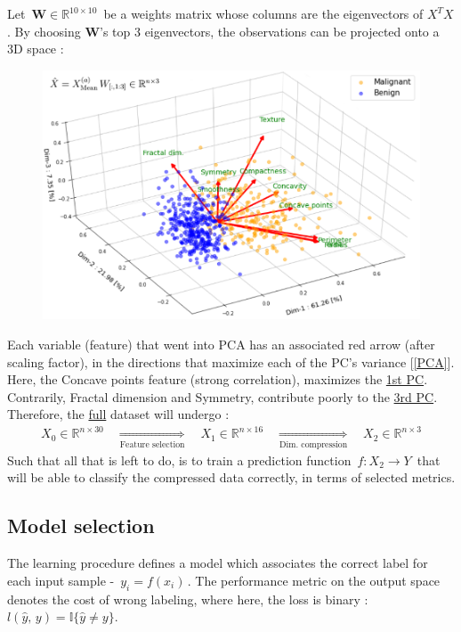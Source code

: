\documentclass[12pt]{article}
\numberwithin{equation}{section}
\begin{document}
\begin{flushleft}
Let $\, \mathbf{W} \in \mathbb{R}^{10\times10} \, $ be a weights matrix whose columns are the eigenvectors of $X^T X$.  By choosing \textbf{W}'s top 3 eigenvectors, the observations can be projected onto a 3D space :
\begin{figure}[H]
\centering
\includegraphics[width=0.935\linewidth, center]{PCA.png}
\end{figure}
Each variable (feature) that went into PCA has an associated red arrow (after scaling factor), in the directions that maximize each of the PC's variance [\ref{PCA}]. Here, the Concave points feature (strong correlation), maximizes the \underline{1st PC}. Contrarily, Fractal dimension and Symmetry, contribute poorly to the \underline{3rd PC}. Therefore, the \underline{full} dataset will undergo :
\begin{align*}
X_0 \in \mathbb{R}^{n \times 30} \quad \underset{\text{Feature selection}}{\Rightarrow} \quad X_1 \in \mathbb{R}^{n \times 16} \quad \underset{\text{Dim. compression}}{\Rightarrow} \quad X_2 \in \mathbb{R}^{n \times 3}
\end{align*}
Such that all that is left to do, is to train a prediction function $\, f : X_2 \rightarrow Y \,$ that will be able to classify the compressed data correctly, in terms of selected metrics.

\subsection{Model selection}
The learning procedure defines a model which associates the correct label for each input sample - $\, y_i = f(x_i) \,$. The performance metric on the output space denotes the cost of wrong labeling, where here, the loss is binary : $ l(\hat{y}, \, y) = \mathbb{I}\{\hat{y} \neq y \}$.


\end{flushleft}
\end{document}
